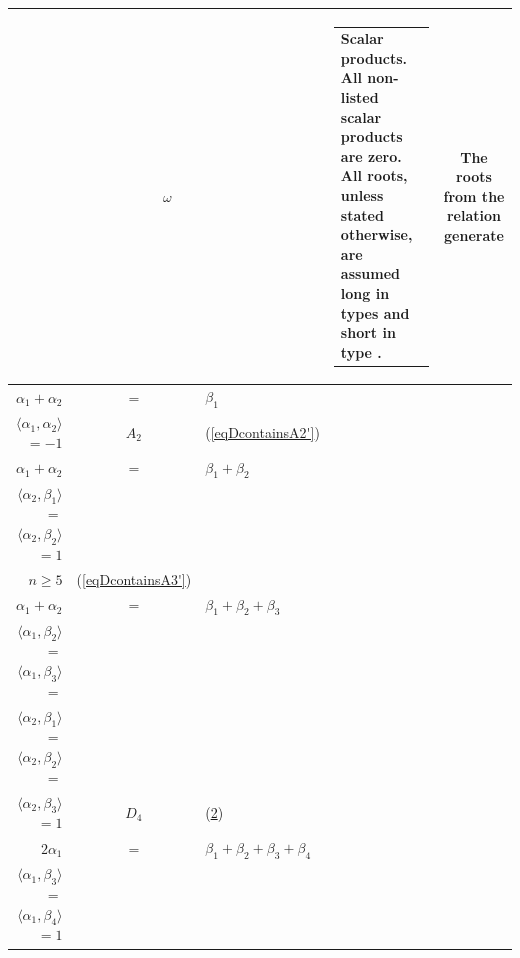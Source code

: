 \documentclass[12pt]{report}
\newcommand{\gG}{\mathfrak{g}}
\newcommand{\so}{\mathrm{so}}
\begin{document}
\noindent \begin{longtable}{rcl | c |c c}
\multicolumn{3}{c|}{$\omega$} & \begin{tabular}{p{4.5cm}}Scalar products. All non-listed scalar products are zero. All roots, unless stated otherwise, are assumed long in types $B,D$ and short in type $C$.\end{tabular}&  \multicolumn{2}{p{2cm}}{The roots from the relation generate }
\endhead
\hline
\multicolumn{5}{c}{$\gG\simeq\so(2n)$}
\\\hline
$\alpha_1+\alpha_2$ &$=$&$\beta_1$&
\begin{tabular}{l}
$\langle\alpha_1, \beta_1 \rangle$ $=$ $\langle\alpha_2,\beta_1\rangle$ $=1$\\
$\langle\alpha_1,\alpha_2\rangle$ $=-1$
\end{tabular}&
 $A_2$&
 {equation} \label{eqDcontainsA2'} (\ref{eqDcontainsA2'})\\\hline
$\alpha_1+\alpha_2$ &$=$&$\beta_1+\beta_2$&
\begin{tabular}{l}
$\langle\alpha_1,\beta_1\rangle$ $=$ $\langle\alpha_1,\beta_2\rangle$ $=$\\ 
$\langle\alpha_2,\beta_1\rangle$ $=$ $\langle\alpha_2,\beta_2\rangle$ $=1$ 
\end{tabular}&
\begin{tabular}{l}
 $A_3\subset A_4$,\\ $n\geq 5$ 
\end{tabular}& {equation} \label{eqDcontainsA3'} (\ref{eqDcontainsA3'})
\\\hline
$\alpha_1+\alpha_2$ &$=$&$\beta_1+\beta_2+\beta_3$&
\begin{tabular}{l}
$\langle\alpha_1,\alpha_2\rangle$ $=$  $\langle\alpha_1,\beta_1\rangle$ $=$\\
$\langle\alpha_1,\beta_2\rangle$ $=$ $\langle\alpha_1,\beta_3\rangle$ $=$ \\
$\langle\alpha_2,\beta_1\rangle$ $=$ $\langle\alpha_2,\beta_2\rangle$ $=$ \\
$\langle\alpha_2,\beta_3\rangle$ $=1$
\end{tabular}& 
$D_4$&
{equation} \label{eqDcontainsD4'} (\ref{eqDcontainsD4'})
\\\hline
$2\alpha_1$ &$=$&$\beta_1+\beta_2+\beta_3+\beta_4$&
\begin{tabular}{l}
$\langle\alpha_1,\beta_1\rangle$ $=$ $\langle\alpha_1,\beta_2\rangle$ $=$ \\
$\langle\alpha_1,\beta_3\rangle$ $=$ $\langle\alpha_1,\beta_4\rangle$ $=1$ 

\end{tabular}
\end{longtable}
\end{document}
